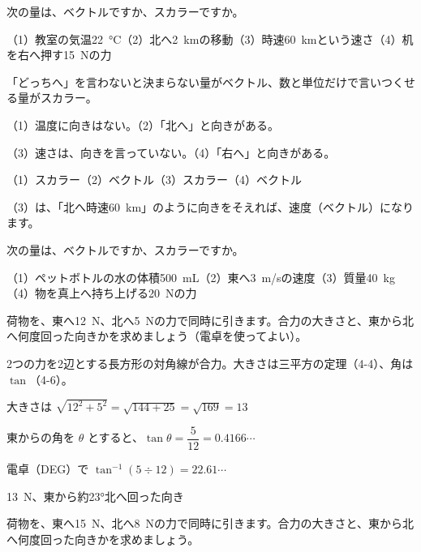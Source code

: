 \begin{reidai}[ベクトルとスカラー]
次の量は、ベクトルですか、スカラーですか。\par
（1）教室の気温\qty{22}{\degreeCelsius}\quad（2）北へ\qty{2}{km}の移動\quad（3）時速\qty{60}{km}という速さ\quad（4）机を右へ押す\qty{15}{N}の力\par
\kangaekata 「どっちへ」を言わないと決まらない量がベクトル、数と単位だけで言いつくせる量がスカラー。\par
\shiki（1）温度に向きはない。\quad（2）「北へ」と向きがある。\par
\hspace*{2.6\zw}（3）速さは、向きを言っていない。\quad（4）「右へ」と向きがある。\par
\kotae （1）スカラー\quad（2）ベクトル\quad（3）スカラー\quad（4）ベクトル
\end{reidai}
（3）は、「北へ時速\qty{60}{km}」のように向きをそえれば、速度（ベクトル）になります。

\begin{jibun}
次の量は、ベクトルですか、スカラーですか。\par
（1）ペットボトルの水の体積\qty{500}{mL}\quad（2）東へ\qty{3}{m/s}の速度\quad（3）質量\qty{40}{kg}\quad（4）物を真上へ持ち上げる\qty{20}{N}の力
\end{jibun}

\begin{reidai}
荷物を、東へ\qty{12}{N}、北へ\qty{5}{N}の力で同時に引きます。合力の大きさと、東から北へ何度回った向きかを求めましょう（電卓を使ってよい）。\par
\kangaekata 2つの力を2辺とする長方形の対角線が合力。大きさは三平方の定理（4-4）、角は $\tan$（4-6）。\par
\shiki 大きさは $\sqrt{12^2+5^2}=\sqrt{144+25}=\sqrt{169}=13$\par
\hspace*{2.6\zw}東からの角を $\theta$ とすると、$\tan\theta=\dfrac{5}{12}=0.4166\cdots$\par
\hspace*{2.6\zw}電卓（DEG）で $\tan^{-1}(5\div12)=22.61\cdots$\par
\kotae \qty{13}{N}、東から約23°北へ回った向き
\end{reidai}

\begin{jibun}
荷物を、東へ\qty{15}{N}、北へ\qty{8}{N}の力で同時に引きます。合力の大きさと、東から北へ何度回った向きかを求めましょう。
\end{jibun}

